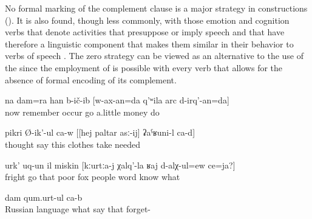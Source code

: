 No formal marking of the complement clause is a major strategy in  constructions (). It is also found, though less commonly, with those emotion and cognition verbs that denote activities that presuppose or imply speech and that have therefore a linguistic component that makes them similar in their behavior to verbs of speech . The zero strategy can be viewed as an alternative to the use of the   since the employment of   is possible with every verb that allows for the absence of formal encoding of its complement.
%
\begin{exe}
	\ex	\label{ex:‎I also thought, I should go to make a little money}
	\gll	na	dam=ra	han	b-ič-ib	[w-ax-an=da	q'ʷila	arc	d-irq'-an=da]\\
		now		remember	occur	go	a.little	money	do\\
	\glt	{}

	\ex	\label{ex:‎He thinks, I need to take these clothes}
	\gll	pikri	Ø-ik'-ul	ca-w	[[hej	paltar	asː-ij]	ʡaˁʁuni-l	ca-d]\\
		thought	say		this	clothes	take	needed	\\
	\glt	{}

		\ex	\label{ex:‎‎‎The poor boy got frightened}
	\gll	urk'	uq-un	il	miskin	[kːurtːa-j	χalq'-la	ʁaj	d-alχ-ul=ew	ce=ja?]\\
		fright	go	that	poor	fox	people	word	know	what\\
	\glt	{}
	
	\ex	\label{ex:‎It is called something in Russian, I forgot}
	\gll	[ʡuˁrus	ʁaj-la	ce=jal	b-ik'-ul	ca-b	it-i-j]	dam	qum.urt-ul	ca-b\\
		Russian	language	what	say		that		forget-	\\
	\glt	{}
\end{exe}

